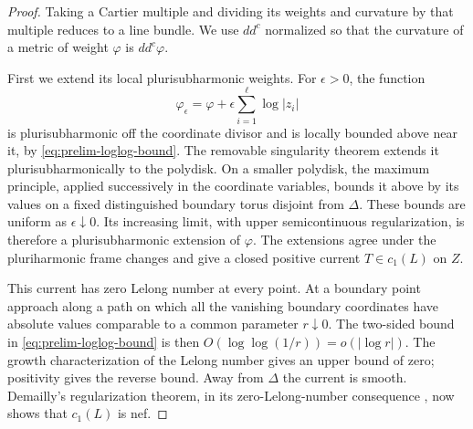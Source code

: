 \begin{proof}
Taking a Cartier multiple and dividing its weights and curvature by that
multiple reduces to a line bundle.  We use $dd^c$ normalized so that the
curvature of a metric of weight $\varphi$ is $dd^c\varphi$.

First we extend its local plurisubharmonic weights.  For $\epsilon>0$,
the function
\[
 \varphi_\epsilon=\varphi+
               \epsilon\sum_{i=1}^{\ell}\log|z_i|
\]
is plurisubharmonic off the coordinate divisor and is locally bounded
above near it, by \eqref{eq:prelim-loglog-bound}.  The removable
singularity theorem extends it plurisubharmonically to the polydisk.
On a smaller polydisk, the maximum principle, applied successively in
the coordinate variables, bounds it above by its values on a fixed
distinguished boundary torus disjoint from $\Delta$.  These bounds are
uniform as $\epsilon\downarrow0$.  Its increasing limit, with upper
semicontinuous regularization, is therefore a plurisubharmonic extension
of $\varphi$.  The extensions agree under the pluriharmonic frame changes
and give a closed positive current $T\in c_1(L)$ on $Z$.

This current has zero Lelong number at every point.  At a boundary point
approach along a path on which all the vanishing boundary coordinates
have absolute values comparable to a common parameter $r\downarrow0$.
The two-sided bound in \eqref{eq:prelim-loglog-bound} is then
$O(\log\log(1/r))=o(|\log r|)$.  The growth characterization of the
Lelong number gives an upper bound of zero; positivity gives the reverse
bound.  Away from $\Delta$ the current is smooth.  Demailly's
regularization theorem, in its zero-Lelong-number consequence
\cite[Corollary 6.4]{Demailly92}, now shows that $c_1(L)$ is nef.


\end{proof}
